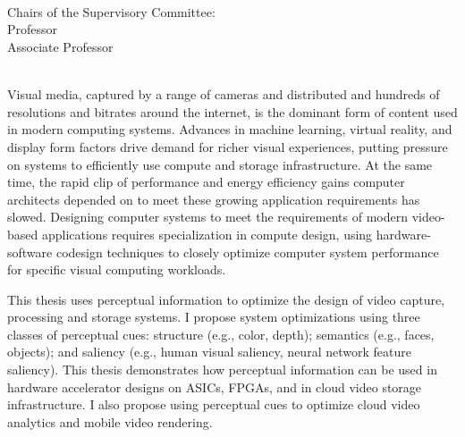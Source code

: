 \begingroup
\let\clearpage\relax
\let\cleardoublepage\relax
\let\cleardoublepage\relax

\thispagestyle{empty}
\begin{center}
     \\
    \bigskip
    {\color{CTtitle}\spacedallcaps{\myTitle} \\ \bigskip
    }
    \bigskip
    \myName \\
    \bigskip
    Chairs of the Supervisory Committee: \\
    Professor \myChair \\
    Associate Professor \myOtherChair \\
    \myDepartment \\
    \bigskip
\end{center}


Visual media, captured by a range of cameras and distributed and hundreds of resolutions and bitrates around the internet, is the dominant form of content used in modern computing systems.
Advances in machine learning, virtual reality, and display form factors drive demand for richer visual experiences, putting pressure on systems to efficiently use compute and storage infrastructure.
At the same time, the rapid clip of performance and energy efficiency gains computer architects depended on to meet these growing application requirements has slowed.
Designing computer systems to meet the requirements of modern video-based applications requires specialization in compute design, using hardware-software codesign techniques to closely optimize computer system performance for specific visual computing workloads.

This thesis uses perceptual information to optimize the design of video capture, processing and storage systems.
I propose system optimizations using three classes of perceptual cues: structure (e.g., color, depth); semantics (e.g., faces, objects); and saliency (e.g., human visual saliency, neural network feature saliency).
This thesis demonstrates how perceptual information can be used in hardware accelerator designs on ASICs, FPGAs, and in cloud video storage infrastructure.
I also propose using perceptual cues to optimize cloud video analytics and mobile video rendering.

\endgroup

\vfill
